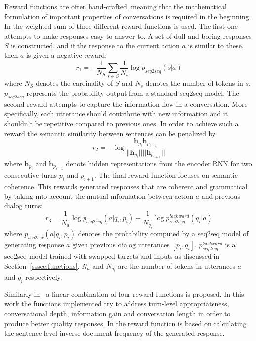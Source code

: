 \documentclass[12pt]{article}
\begin{document}
Reward functions are often hand-crafted, meaning that the mathematical formulation of important properties of conversations is required in the beginning. In \cite{Li_RL:2016} the weighted sum of three different reward functions is used. The first one attempts to make responses easy to answer to. A set of dull and boring responses \(S\) is constructed, and if the response to the current action \(a\) is similar to these, then \(a\) is given a negative reward:
\begin{equation}
r_1=-\frac{1}{N_S}\sum_{s\in S}\frac{1}{N_s}\log{p_{seq2seq}(s|a)}
\end{equation}
where \(N_S\) denotes the cardinality of \(S\) and \(N_s\) denotes the number of tokens in \(s\). \(p_{seq2seq}\) represents the probability output from a standard seq2seq model. The second reward attempts to capture the information flow in a conversation. More specifically, each utterance should contribute with new information and it shouldn't be repetitive compared to previous ones. In order to achieve such a reward the semantic similarity between sentences can be penalized by
\begin{equation}
r_2=-\log{\frac{\bm{h}_{p_{i}} \bm{h}_{p_{i+1}}}{||\bm{h}_{p_{i}}|| ||\bm{h}_{p_{i+1}}|| }}
\end{equation}
where \(\bm{h}_{p_{i}}\) and \(\bm{h}_{p_{i+1}}\) denote hidden representations from the encoder RNN for two consecutive turns \(p_i\) and \(p_{i+1}\). The final reward function focuses on semantic coherence. This rewards generated responses that are coherent and grammatical by taking into account the mutual information between action \(a\) and previous dialog turns:
\begin{equation}
r_3=\frac{1}{N_a}\log{p_{seq2seq}(a|q_i,p_i)}+\frac{1}{N_{q_i}}\log{p_{seq2seq}^{backward}(q_i|a)}
\end{equation}
where \(p_{seq2seq}(a|q_i,p_i)\) denotes the probability computed by a seq2seq model of generating response \(a\) given previous dialog utterances \([p_i,q_i]\). \(p_{seq2seq}^{backward}\) is a seq2seq model trained with swapped targets and inputs as discussed in Section~\ref{sssec:functions}. \(N_a\) and \(N_{q_i}\) are the number of tokens in utterances \(a\) and \(q_i\) respectively.

Similarly in \cite{Yu:2017}, a linear combination of four reward functions is proposed. In this work the functions implemented try to address turn-level appropriateness, conversational depth, information gain and conversation length in order to produce better quality responses. In \cite{Yao:2016} the reward function is based on calculating the sentence level inverse document frequency \cite{Salton:1988} of the generated response.
\end{document}
